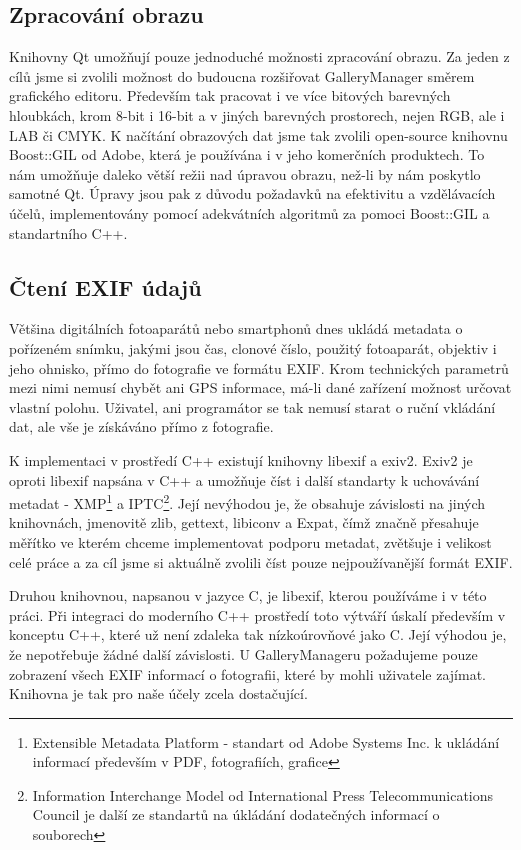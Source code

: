 \documentclass[11pt,twoside,a4paper]{book}
\begin{document}
\subsection{Zpracování obrazu}
\indent
Knihovny Qt umožňují pouze jednoduché možnosti zpracování obrazu. Za jeden z cílů jsme si zvolili možnost do budoucna rozšiřovat GalleryManager směrem grafického editoru. Především tak pracovat i ve více bitových barevných hloubkách, krom 8-bit i 16-bit a v jiných barevných prostorech, nejen RGB, ale i LAB či CMYK. K načítání obrazových dat jsme tak zvolili open-source knihovnu Boost::GIL od Adobe, která je používána i v jeho komerčních produktech. To nám umožňuje daleko větší režii nad úpravou obrazu, než-li by nám poskytlo samotné Qt. Úpravy jsou pak z důvodu požadavků na efektivitu a vzdělávacích účelů, implementovány pomocí adekvátních algoritmů za pomoci Boost::GIL a standartního C++.

\subsection{Čtení EXIF údajů}
\noindent
Většina digitálních fotoaparátů nebo smartphonů dnes ukládá metadata o pořízeném snímku, jakými jsou čas, clonové číslo, použitý fotoaparát, objektiv i jeho ohnisko, přímo do fotografie ve formátu EXIF. Krom technických parametrů mezi nimi nemusí chybět ani GPS informace, má-li dané zařízení možnost určovat vlastní polohu. Uživatel, ani programátor se tak nemusí starat o ruční vkládání dat, ale vše je získáváno přímo z fotografie.

\indent
K implementaci v prostředí C++ existují knihovny libexif a exiv2. Exiv2 je oproti libexif napsána v C++ a umožňuje číst i další standarty k uchovávání metadat - XMP\footnote{Extensible Metadata Platform - standart od Adobe Systems Inc. k ukládání informací především v PDF, fotografiích, grafice} a IPTC\footnote{Information Interchange Model od International Press Telecommunications Council je další ze standartů na úkládání dodatečných informací o souborech}. Její nevýhodou je, že obsahuje závislosti na jiných knihovnách, jmenovitě zlib, gettext, libiconv a Expat, čímž značně přesahuje měřítko ve kterém chceme implementovat podporu metadat, zvětšuje i velikost celé práce a za cíl jsme si aktuálně zvolili číst pouze nejpoužívanější formát EXIF.

\indent
Druhou knihovnou, napsanou v jazyce C, je libexif\cite{libexif}, kterou používáme i v této práci. Při integraci do moderního C++ prostředí toto výtváří úskalí především v konceptu C++, které už není zdaleka tak nízkoúrovňové jako C. Její výhodou je, že nepotřebuje žádné další závislosti. U GalleryManageru požadujeme pouze zobrazení všech EXIF informací o fotografii, které by mohli uživatele zajímat. Knihovna je tak pro naše účely zcela dostačující.
\end{document}
